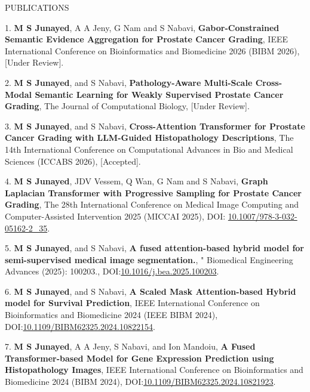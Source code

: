 \begin{rSection}{ PUBLICATIONS}


{1. {\bf M S Junayed}, A A Jeny, G Nam and S Nabavi, {\bf{Gabor-Constrained Semantic Evidence Aggregation for Prostate Cancer Grading}}, IEEE International Conference on Bioinformatics and Biomedicine 2026 (BIBM 2026), {[Under Review]}.}

{2. {\bf M S Junayed}, and S Nabavi, {\bf{Pathology-Aware Multi-Scale Cross-Modal Semantic Learning for Weakly Supervised Prostate Cancer Grading}}, The Journal of Computational Biology, {[Under Review]}.}

{3. {\bf M S Junayed}, and S Nabavi, {\bf{Cross-Attention Transformer for Prostate Cancer Grading with LLM-Guided Histopathology Descriptions}}, The 14th International Conference on Computational Advances in Bio and Medical Sciences (ICCABS 2026), {[Accepted]}.}

{4. {\bf M S Junayed}, JDV Vessem, Q Wan, G Nam and S Nabavi, {\bf{Graph Laplacian Transformer with Progressive Sampling for Prostate Cancer Grading}}, The 28th International Conference on Medical Image Computing and Computer-Assisted Intervention 2025 (MICCAI 2025), DOI: {\href{https://link.springer.com/chapter/10.1007/978-3-032-05162-2_35}{10.1007/978-3-032-05162-2\_35}}.}

{5. {\bf M S Junayed}, and S Nabavi, {\bf{A fused attention-based hybrid model for semi-supervised medical image segmentation.}}, " Biomedical Engineering Advances (2025): 100203., DOI:{\href{https://www.sciencedirect.com/science/article/pii/S2667099225000593}{10.1016/j.bea.2025.100203}}.}

{6. {\bf M S Junayed}, and S Nabavi, {\bf{A Scaled Mask Attention-based Hybrid model for Survival Prediction}}, IEEE International Conference on Bioinformatics and Biomedicine 2024 (IEEE BIBM 2024), DOI:{\href{https://ieeexplore.ieee.org/abstract/document/10822154}{10.1109/BIBM62325.2024.10822154}}.}

{7. {\bf M S Junayed}, A A Jeny, S Nabavi, and Ion Mandoiu, {\bf{A Fused Transformer-based Model for Gene Expression Prediction using Histopathology Images}}, IEEE International Conference on Bioinformatics and Biomedicine 2024 (BIBM 2024), DOI:{\href{https://ieeexplore.ieee.org/abstract/document/10821923}{10.1109/BIBM62325.2024.10821923}}.}


\end{rSection}
